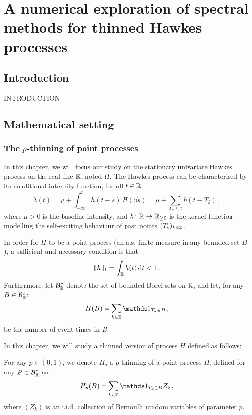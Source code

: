 
\chapter[][]{A numerical exploration of spectral methods for thinned Hawkes processes}

\section{Introduction}

INTRODUCTION

\section{Mathematical setting}\label{sec:chap5_mathsetting}

\subsection{The $p$-thinning of point processes}\label{sec:chap5_hawkesprocess}

In this chapter, we will focus our study on the stationary univariate Hawkes process on the real line ${\mathbb R}$, noted $H$.
The Hawkes process can be characterised by its conditional intensity function, for all $t\in{\mathbb R}$:
\begin{equation}\label{eq:chap5_hawkes_intensity}
    \lambda(t) = \mu + \int_{-\infty}^{t}{h(t-s)\,H(\dd s)} = \mu + \sum_{T_k \leq t}{h(t-T_k)}\,,
\end{equation}
where $\mu > 0$ is the baseline intensity, and $h\colon{\mathbb R}\to {\mathbb R}_{\geq 0}$ is the kernel function modelling the self-exciting behaviour of past points $(T_k)_{k\in{\mathbb Z}}$.

In order for $H$ to be a point process (\ie an a.s. finite measure in any bounded set $B$), 
a sufficient and necessary condition \parencite{Hawkes1971} is that 
\[\|h\|_1 = \int_{{\mathbb R}}{h(t)\,{\mathrm{d}} t} < 1\,.\]
Furthermore, let $\mathcal{B}_{{\mathbb R}}^c$ denote the set of bounded Borel sets on ${\mathbb R}$, and let, for any $B\in\mathcal{B}_{{\mathbb R}}^c$:
\[H(B) = \sum_{k\in\ZZ}{\II_{T_k \in B}}\,,\]
be the number of event times in $B$. 

In this chapter, we will study a thinned version of process $H$ defined as follows:
\begin{definition}\label{def:chap5_thinning}
For any $p\in(0,1)$, we denote $H_p$ a $p$-thinning of a point process $H$, defined for any $B\in\mathcal{B}_{{\mathbb R}}^c$ as:
\[H_p(B) = \sum_{k\in\ZZ}{\II_{T_k \in B} Z_k}\,,\]
where $(Z_k)$ is an i.i.d. collection of Bernoulli random variables of parameter $p$.
\end{definition}

